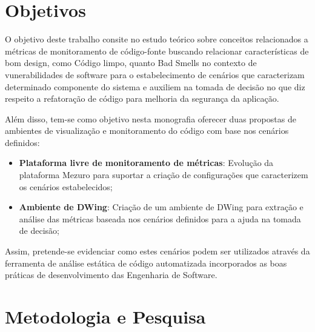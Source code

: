
\section{Objetivos}


O objetivo deste trabalho consite no estudo teórico sobre conceitos relacionados a métricas de monitoramento de código-fonte buscando relacionar características de bom design, como Código limpo, quanto Bad Smells no contexto de vunerabilidades de software  para o estabelecimento de cenários que caracterizam determinado componente do sistema e auxiliem na tomada de decisão no que diz respeito a refatoração de código para melhoria da segurança da aplicação.

%

Além disso, tem-se como objetivo nesta monografia oferecer duas propostas de ambientes de visualização e monitoramento do código com base nos cenários definidos:
\begin{itemize}
\item \textbf{Plataforma livre de monitoramento de métricas}: Evolução da plataforma Mezuro para suportar a criação de configurações que caracterizem os cenários estabelecidos;
\item \textbf{Ambiente de DWing}: Criação de um ambiente de DWing para extração e análise das métricas baseada nos cenários definidos para a ajuda na tomada de decisão;
\end{itemize}

Assim, pretende-se evidenciar como estes cenários podem ser utilizados através da ferramenta de análise estática de código automatizada incorporados as boas práticas de desenvolvimento das Engenharia de Software.




\section{Metodologia e Pesquisa}
